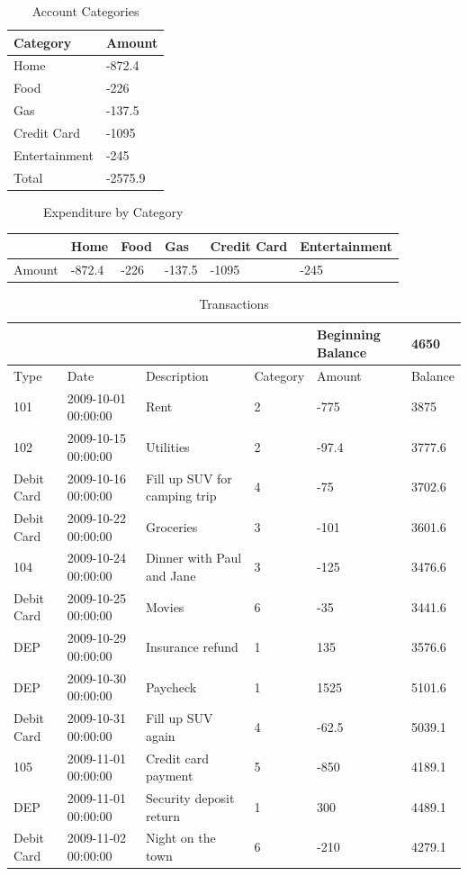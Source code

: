 \documentclass[11pt,a4paper]{article}
\begin{document}
\begin{table}[h]
\caption{Account Categories}
\begin{tabular}{|l|l|}
\hline
Category & Amount \\ \hline
Home & -872.4 \\ \hline
Food & -226 \\ \hline
Gas & -137.5 \\ \hline
Credit Card & -1095 \\ \hline
Entertainment & -245 \\ \hline
Total & -2575.9 \\ \hline
\end{tabular}
\end{table}

\begin{figure}[h]
\caption{Expenditure by Category}
\end{figure}

\begin{table}[h]
\begin{tabular}{|l|l|l|l|l|l|}
\hline
 & Home & Food & Gas & Credit Card & Entertainment \\ \hline
Amount & -872.4 & -226 & -137.5 & -1095 & -245 \\ \hline
\end{tabular}
\end{table}

\begin{table}[h]
\caption{Transactions}
\begin{tabular}{|l|l|l|l|l|l|}
\hline
 &  &  &  & Beginning Balance & 4650 \\ \hline
Type & Date & Description & Category & Amount & Balance \\ \hline
101 & 2009-10-01 00:00:00 & Rent & 2 & -775 & 3875 \\ \hline
102 & 2009-10-15 00:00:00 & Utilities & 2 & -97.4 & 3777.6 \\ \hline
Debit Card & 2009-10-16 00:00:00 & Fill up SUV for camping trip & 4 & -75 & 3702.6 \\ \hline
Debit Card & 2009-10-22 00:00:00 & Groceries & 3 & -101 & 3601.6 \\ \hline
104 & 2009-10-24 00:00:00 & Dinner with Paul and Jane & 3 & -125 & 3476.6 \\ \hline
Debit Card & 2009-10-25 00:00:00 & Movies & 6 & -35 & 3441.6 \\ \hline
DEP & 2009-10-29 00:00:00 & Insurance refund & 1 & 135 & 3576.6 \\ \hline
DEP & 2009-10-30 00:00:00 & Paycheck & 1 & 1525 & 5101.6 \\ \hline
Debit Card & 2009-10-31 00:00:00 & Fill up SUV again & 4 & -62.5 & 5039.1 \\ \hline
105 & 2009-11-01 00:00:00 & Credit card payment & 5 & -850 & 4189.1 \\ \hline
DEP & 2009-11-01 00:00:00 & Security deposit return & 1 & 300 & 4489.1 \\ \hline
Debit Card & 2009-11-02 00:00:00 & Night on the town & 6 & -210 & 4279.1 \\ \hline
\end{tabular}
\end{table}
\end{document}
